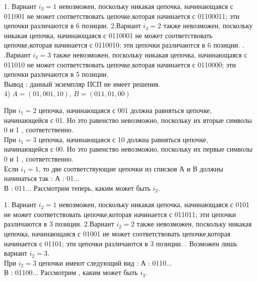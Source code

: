 \documentclass[12pt,a4paper]{article}
\begin{document}
\begin{enumerate}
	1. Вариант $i_3 = 1$ невозможен, поскольку никакая цепочка, начинающаяся с 011001 не может соответствовать цепочке,которая начинается с 01100011; эти цепочки различаются в 6 позиции.
	\newline
	2.Вариант $i_3 = 2$ также невозможен, поскольку никакая цепочка, начинающаяся с 0110001 не может соответствовать цепочке,которая начинается с 0110010; эти цепочки различаются в 6 позиции.
	. .Вариант $i_3 = 3$ также невозможен, поскольку никакая цепочка, начинающаяся с 011010 не может соответствовать цепочке,которая начинается с 0110000; эти цепочки различаются в 5 позиции.\\
	\newline
	Вывод : данный экземпляр ПСП не имеет решения.\\
	
	4) $A=(01,001,10)$, $B=(011,01,00)$
	
	
	При $i_{1} = 2$ цепочка, начинающаяся с 001 должна равняться цепочке, начинающейся с 01. Но это равенство невозможно, поскольку их вторые символы 0 и 1 , соответственно.\\
	При $i_{1} = 3$ цепочка, начинающаяся с 10 должна равняться цепочке, начинающейся с 00. Но это равенство невозможно, поскольку их первые символы 0 и 1 , соответственно.\\
	Если $i_{1} = 1$, то две соответствующие цепочки из списков А и В должны начинаться так :
	\newline
	А : 01... \\
	В : 011...
	\newline
	Рассмотрим теперь, каким может быть $i_2$. 
	
	1. Вариант $i_2 = 1$ невозможен, поскольку никакая цепочка, начинающаяся с 0101 не может соответствовать цепочке,которая начинается с 011011; эти цепочки различаются в 3 позиции.
	\newline
	2.Вариант $i_2 = 2$ также невозможен, поскольку никакая цепочка, начинающаяся с 01001 не может соответствовать цепочке,которая начинается с 01101; эти цепочки различаются в 3 позиции.
	. Возможен лишь вариант $i_2 = 3$.\\
	При $i_2 = 3$ цепочки имеют следующий вид :
	\newline
	А : 0110...\\
	В : 01100...
	\newline
	Рассмотрим , каким может быть $i_3$. 
	

\end{enumerate}
\end{document}
